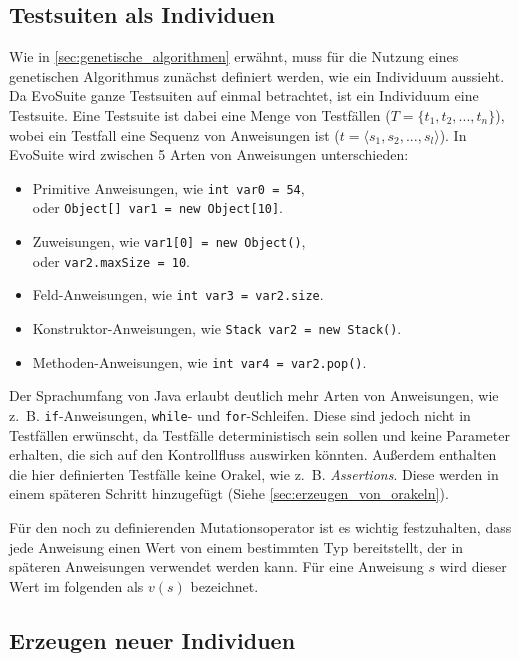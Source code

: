 \documentclass[a4paper,11pt]{article}
\begin{document}
\subsection{Testsuiten als Individuen}

Wie in \cref{sec:genetische_algorithmen} erwähnt, muss für die Nutzung eines genetischen Algorithmus zunächst definiert werden, wie ein Individuum aussieht.
Da EvoSuite ganze Testsuiten auf einmal betrachtet, ist ein Individuum eine Testsuite.
Eine Testsuite ist dabei eine Menge von Testfällen ($T = \{t_1, t_2, ..., t_n\}$), wobei ein Testfall eine Sequenz von Anweisungen ist ($t = \langle s_1, s_2, ..., s_l \rangle$).
In EvoSuite wird zwischen 5 Arten von Anweisungen unterschieden:
\begin{itemize}
	\item Primitive Anweisungen, wie \lstinline{int var0 = 54},\\
	oder \lstinline{Object[] var1 = new Object[10]}.
	\item Zuweisungen, wie \lstinline{var1[0] = new Object()},\\
	oder \lstinline{var2.maxSize = 10}.
	\item Feld-Anweisungen, wie \lstinline{int var3 = var2.size}.
	\item Konstruktor-Anweisungen, wie \lstinline{Stack var2 = new Stack()}.
	\item Methoden-Anweisungen, wie \lstinline{int var4 = var2.pop()}.
\end{itemize}
Der Sprachumfang von Java erlaubt deutlich mehr Arten von Anweisungen, wie z.~B. \lstinline{if}-Anweisungen, \lstinline{while}- und \lstinline{for}-Schleifen.
Diese sind jedoch nicht in Testfällen erwünscht, da Testfälle deterministisch sein sollen und keine Parameter erhalten, die sich auf den Kontrollfluss auswirken könnten.
Außerdem enthalten die hier definierten Testfälle keine Orakel, wie z.~B. \textit{Assertions}.
Diese werden in einem späteren Schritt hinzugefügt (Siehe \cref{sec:erzeugen_von_orakeln}).

Für den noch zu definierenden Mutationsoperator ist es wichtig festzuhalten, dass jede Anweisung einen Wert von einem bestimmten Typ bereitstellt, der in späteren Anweisungen verwendet werden kann.
Für eine Anweisung $s$ wird dieser Wert im folgenden als $v(s)$ bezeichnet.

\subsection{Erzeugen neuer Individuen}
\end{document}
